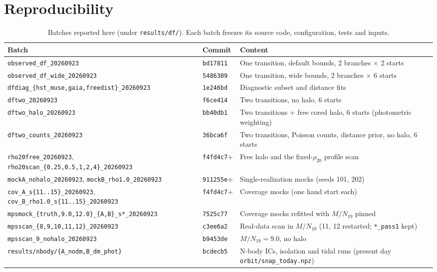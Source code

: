 \documentclass[11pt,a4paper]{article}
\begin{document}
\appendix
\section{Reproducibility}

\begin{table}[htbp]
\centering\small
\caption{Batches reported here (under \texttt{results/df/}). Each batch
freezes its source code, configuration, tests and inputs.}
\begin{tabularx}{\linewidth}{llY}
\toprule
Batch & Commit & Content\\
\midrule
\texttt{observed\_df\_20260923} & \texttt{bd17811} & One transition, default bounds, 2 branches $\times$ 2 starts\\
\texttt{observed\_df\_wide\_20260923} & \texttt{5486309} & One transition, wide bounds, 2 branches $\times$ 6 starts\\
\texttt{dfdiag\_\{hst\_muse,gaia,freedist\}\_20260923} & \texttt{1e246bd} & Diagnostic subset and distance fits\\
\texttt{dftwo\_20260923} & \texttt{f6ce414} & Two transitions, no halo, 6 starts\\
\texttt{dftwo\_halo\_20260923} & \texttt{bb40db1} & Two transitions + free cored halo, 6 starts (photometric weighting)\\
\texttt{dftwo\_counts\_20260923} & \texttt{36bca6f} & Two transitions, Poisson counts, distance prior, no halo, 6 starts\\
\texttt{rho20free\_20260923}, \texttt{rho20scan\_\{0.25,0.5,1,2,4\}\_20260923} & \texttt{f4fd4c7}+ & Free halo and the fixed-$\rho_{20}$ profile scan\\
\texttt{mockA\_nohalo\_20260923}, \texttt{mockB\_rho1.0\_20260923} & \texttt{911255e}+ & Single-realization mocks (seeds 101, 202)\\
\texttt{cov\_A\_s\{11..15\}\_20260923}, \texttt{cov\_B\_rho1.0\_s\{11..15\}\_20260923} & \texttt{f4fd4c7}+ & Coverage mocks (one hand start each)\\
\texttt{mpsmock\_\{truth,9.0,12.0\}\_\{A,B\}\_s*\_20260923} & \texttt{7525c77} & Coverage mocks refitted with $M/N_{19}$ pinned\\
\texttt{mpsscan\_\{8,9,10,11,12\}\_20260923} & \texttt{c3ee6a2} & Real-data scan in $M/N_{19}$ (11, 12 restarted; \texttt{*\_pass1} kept)\\
\texttt{mpsscan\_9\_nohalo\_20260923} & \texttt{b9453de} & $M/N_{19}=9.0$, no halo\\
\texttt{results/nbody/\{A\_nodm,B\_dm\_phot\}} & \texttt{bcdecb5} & N-body ICs, isolation and tidal runs (present day \texttt{orbit/snap\_today.npz})\\
\bottomrule
\end{tabularx}
\end{table}
\end{document}
